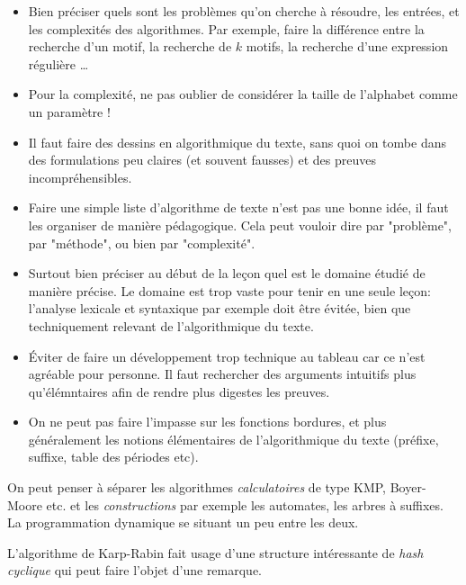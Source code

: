 \documentclass{article}
\begin{document}
\begin{itemize}
    \item Bien préciser quels sont les problèmes qu'on cherche 
        à résoudre, les entrées, et les complexités des algorithmes.
        Par exemple, faire la différence entre la recherche 
        d'un motif, la recherche de $k$ motifs, la recherche 
        d'une expression régulière \dots

    \item Pour la complexité, ne pas oublier de 
        considérer la taille de l'alphabet comme un paramètre !

    \item Il faut faire des dessins en algorithmique du texte, sans 
        quoi on tombe dans des formulations peu claires (et souvent 
        fausses) et des preuves incompréhensibles.

    \item Faire une simple liste d'algorithme de texte n'est pas 
        une bonne idée, il faut les organiser de manière pédagogique.
        Cela peut vouloir dire par "problème", par "méthode", ou 
        bien par "complexité".

    \item Surtout bien préciser au début de la leçon quel est le 
        domaine étudié de manière précise. Le domaine est trop vaste 
        pour tenir en une seule leçon: l'analyse lexicale et 
        syntaxique par exemple doit être évitée, bien que techniquement
        relevant de l'algorithmique du texte.

    \item Éviter de faire un développement trop technique au tableau 
        car ce n'est agréable pour personne. Il faut rechercher 
        des arguments intuitifs plus qu'élémntaires afin de rendre 
        plus digestes les preuves.

    \item On ne peut pas faire l'impasse sur les fonctions bordures,
        et plus généralement les notions élémentaires de l'algorithmique
        du texte (préfixe, suffixe, table des périodes etc).
\end{itemize}

\secidees

On peut penser à séparer les algorithmes \emph{calculatoires}
de type KMP, Boyer-Moore etc. et les \emph{constructions}
par exemple les automates, les arbres à suffixes. La programmation
dynamique se situant un peu entre les deux.

L'algorithme de Karp-Rabin fait usage d'une structure intéressante
de \emph{hash cyclique} qui peut faire l'objet d'une remarque.
\end{document}
